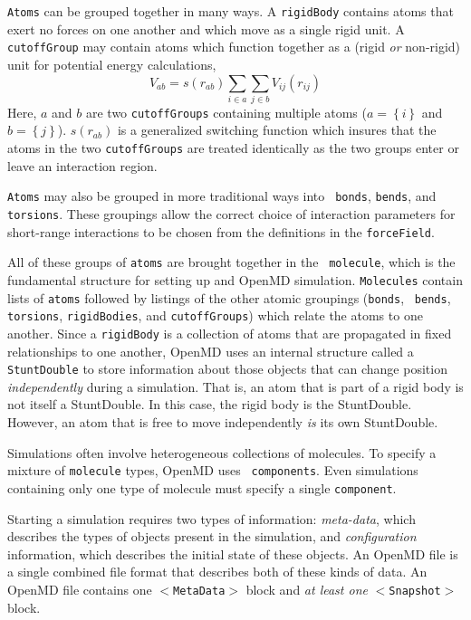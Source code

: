 \documentclass[]{book}
\begin{document}
{\tt Atoms} can be grouped together in many ways.  A {\tt rigidBody}
contains atoms that exert no forces on one another and which move as a
single rigid unit.  A {\tt cutoffGroup} may contain atoms which
function together as a (rigid {\it or} non-rigid) unit for potential
energy calculations,
\begin{equation}
V_{ab} = s(r_{ab}) \sum_{i \in a} \sum_{j \in b} V_{ij}(r_{ij})
\end{equation}
Here, $a$ and $b$ are two {\tt cutoffGroups} containing multiple atoms
($a = \left\{i\right\}$ and $b = \left\{j\right\}$).  $s(r_{ab})$ is a
generalized switching function which insures that the atoms in the two
{\tt cutoffGroups} are treated identically as the two groups enter or
leave an interaction region.

{\tt Atoms} may also be grouped in more traditional ways into {\tt
bonds}, {\tt bends}, and {\tt torsions}.  These groupings allow the
correct choice of interaction parameters for short-range interactions
to be chosen from the definitions in the {\tt forceField}.

All of these groups of {\tt atoms} are brought together in the {\tt
molecule}, which is the fundamental structure for setting up and {\sc
OpenMD} simulation.  {\tt Molecules} contain lists of {\tt atoms}
followed by listings of the other atomic groupings ({\tt bonds}, {\tt
bends}, {\tt torsions}, {\tt rigidBodies}, and {\tt cutoffGroups})
which relate the atoms to one another.  Since a {\tt rigidBody} is a
collection of atoms that are propagated in fixed relationships to one
another, {\sc OpenMD} uses an internal structure called a {\tt
StuntDouble} to store information about those objects that can change
position {\it independently} during a simulation.  That is, an atom
that is part of a rigid body is not itself a StuntDouble.  In this
case, the rigid body is the StuntDouble.  However, an atom that is
free to move independently {\it is} its own StuntDouble.

Simulations often involve heterogeneous collections of molecules.  To
specify a mixture of {\tt molecule} types, {\sc OpenMD} uses {\tt
components}.  Even simulations containing only one type of molecule
must specify a single {\tt component}.

Starting a simulation requires two types of information: {\it
meta-data}, which describes the types of objects present in the
simulation, and {\it configuration} information, which describes the
initial state of these objects.  An {\sc OpenMD} file is a single
combined file format that describes both of these kinds of data.  An
{\sc OpenMD} file contains one {\tt $<$MetaData$>$} block and {\it at least
one} {\tt $<$Snapshot$>$} block.
\end{document}
